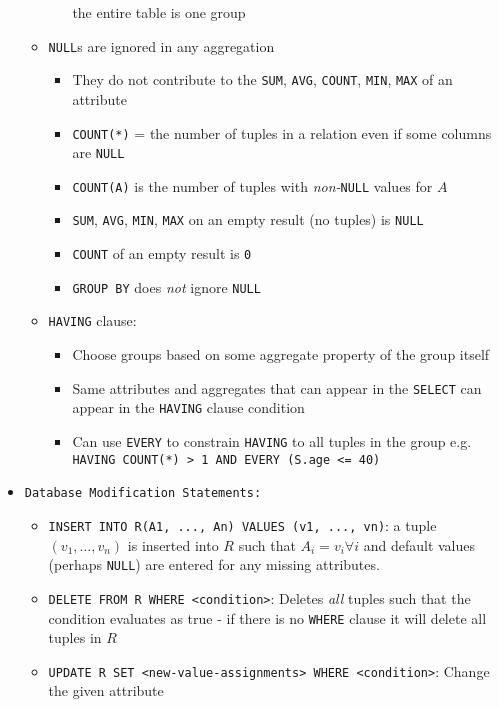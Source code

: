 \documentclass[landscape,8pt]{extarticle}
\newcommand{\code}{\lstinline}
\begin{document}
\begin{multicols}{4}
\begin{itemize}
\begin{itemize}
\begin{itemize}
        the entire table is one group
    \end{itemize}
    \item \code{NULL}s are ignored in any aggregation
    \begin{itemize}
        \item They do not contribute to the \code{SUM}, \code{AVG}, \code{COUNT}, \code{MIN},
        \code{MAX} of an attribute
        \item \code{COUNT(*)} = the number of tuples in a relation even if some columns are \code{NULL}
        \item \code{COUNT(A)} is the number of tuples with \emph{non-}\code{NULL} values for $A$
        \item \code{SUM}, \code{AVG}, \code{MIN}, \code{MAX} on an empty result (no tuples) is \code{NULL}
        \item \code{COUNT} of an empty result is \code{0}
        \item \code{GROUP BY} does \emph{not} ignore \code{NULL}
    \end{itemize}
    \item \code{HAVING} clause:
    \begin{itemize}
        \item Choose groups based on some aggregate property of the group itself
        \item Same attributes and aggregates that can appear in the \code{SELECT} can appear in the
        \code{HAVING} clause condition
        \item Can use \code{EVERY} to constrain \code{HAVING} to all tuples in the group e.g. \code{HAVING COUNT(*) > 1 AND EVERY (S.age <= 40)}
    \end{itemize}
\end{itemize}
\item \code{Database Modification Statements:}
\begin{itemize}
    \item \code{INSERT INTO R(A1, ..., An) VALUES (v1, ..., vn)}: a tuple $(v_1, \ldots, v_n)$ is
    inserted into $R$ such that $A_i = v_i \forall i$ and default values (perhaps \code{NULL}) are
    entered for any missing attributes.
    \item \code{DELETE FROM R WHERE <condition>}: Deletes \emph{all} tuples such that the condition
    evaluates as true - if there is no \code{WHERE} clause it will delete all tuples in $R$
    \item \code{UPDATE R SET <new-value-assignments> WHERE <condition>}: Change the given attribute

\end{itemize}
\end{itemize}
\end{multicols}
\end{document}
